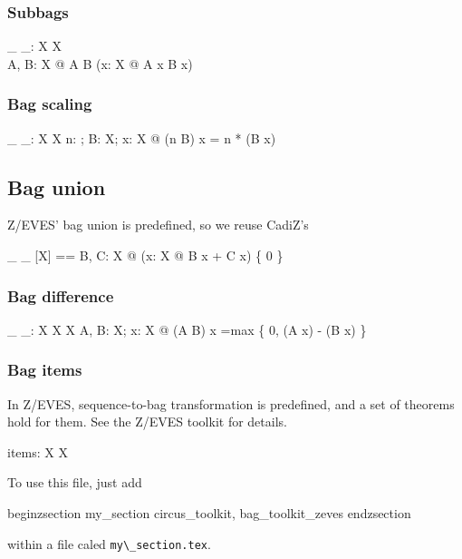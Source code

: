 \documentclass[draft,a4paper,10pt,wd]{article}
\begin{document}
\subsubsection*{Subbags}

\begin{gendef}[X]
  \_ \subbageq \_: \bag X \rel \bag X \\
\where
  \forall A, B: \bag X @ A \subbageq B \iff
	(\forall x: X @ A \bcount x \leq B \bcount x)
\end{gendef}

\subsubsection*{Bag scaling}

\begin{gendef}[X]
  \_ \otimes \_: \nat \cross \bag X \fun \bag X
\where
  \forall n: \nat; B: \bag X; x: X @
     (n \otimes B) \bcount x = n * (B \bcount x)
\end{gendef}

\subsection*{Bag union }

Z/EVES' bag union is predefined, so we reuse CadiZ's
\begin{zed}
\_ \uplus \_ [X] == \lambda B, C: \bag X @ (\lambda x: X @ B \bcount x + C \bcount x) \nrres \{ 0 \}
\end{zed}

\subsubsection*{Bag difference}

\begin{gendef}[X]
  \_ \uminus \_: \bag X \cross \bag X \fun \bag X
\where
  \forall A, B: \bag X; x: X @
     (A \uminus B) \bcount x =max \{ 0, (A \bcount x) - (B \bcount x) \}
\end{gendef}

\subsubsection*{Bag items}

In Z/EVES, sequence-to-bag transformation is predefined, and a set
of theorems hold for them. See the Z/EVES toolkit for details.
%
\begin{gendef}[X]
  items: \seq X \fun \bag X
\end{gendef}

To use this file, just add

begin{zsection}
\SECTION my\_section \parents circus\_toolkit, bag\_toolkit\_zeves
end{zsection}

within a file caled \verb'my\_section.tex'.
\end{document}
